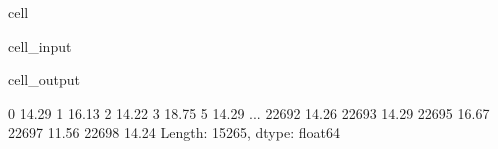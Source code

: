 \documentclass[letterpaper,10pt,english]{sphinxmanual}
\begin{document}
\begin{sphinxuseclass}{cell}
\begin{sphinxuseclass}{cell_input}
\begin{sphinxVerbatim}[commandchars=\\\{\}]
  \PYG{p}{[}\PYG{p}{]}  \PYG{p}{[}\PYG{p}{]}  \PYG{p}{[}\PYG{p}{]}
\end{sphinxVerbatim}

\end{sphinxuseclass}
\begin{sphinxuseclass}{cell_output}
\begin{sphinxVerbatim}[commandchars=\\\{\}]
0        14.29
1        16.13
2        14.22
3        18.75
5        14.29
         ...  
22692    14.26
22693    14.29
22695    16.67
22697    11.56
22698    14.24
Length: 15265, dtype: float64
\end{sphinxVerbatim}

\end{sphinxuseclass}
\end{sphinxuseclass}
\end{document}
